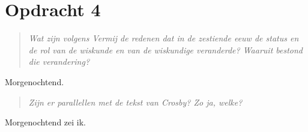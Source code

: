 \documentclass[a4paper,11pt]{article}
\begin{document}
\section*{Opdracht 4}


\begin{quote}
\emph{Wat zijn volgens Vermij de redenen dat in de zestiende eeuw de status en
  de rol van de wiskunde en van de wiskundige veranderde? Waaruit bestond die
  verandering?}
\end{quote}


Morgenochtend.


\begin{quote}
\emph{Zijn er parallellen met de tekst van Crosby? Zo ja, welke?}
\end{quote}


Morgenochtend zei ik.
\end{document}
